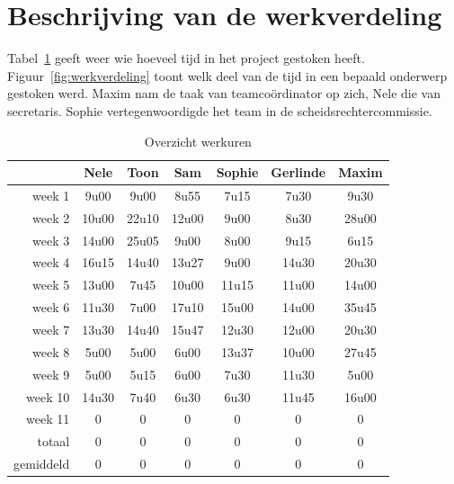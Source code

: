 \documentclass[eind]{penoverslag}
\begin{document}
\section{Beschrijving van de werkverdeling}
\label{Assec:werkverdeling}
Tabel~\ref{tab:werkuren} geeft weer wie hoeveel tijd in het project gestoken heeft. Figuur~\ref{fig:werkverdeling} toont welk deel van de tijd in een bepaald onderwerp gestoken werd.
Maxim nam de taak van teamco\"ordinator op zich, Nele die van secretaris. Sophie vertegenwoordigde het team in de scheidsrechtercommissie.

\begin{table}[h]
\begin{center}
    \begin{tabular}{ r | c  c  c  c  c  c}
     & Nele & Toon & Sam & Sophie & Gerlinde & Maxim \\ \hline
    week 1 & 9u00 & 9u00 & 8u55 & 7u15 & 7u30 & 9u30\\
   	week 2 & 10u00 & 22u10 & 12u00 & 9u00 & 8u30 & 28u00\\
	week 3 & 14u00 & 25u05 & 9u00 & 8u00 & 9u15 & 6u15\\
	week 4 & 16u15 & 14u40 & 13u27 & 9u00 & 14u30 & 20u30\\
	week 5 & 13u00 & 7u45 & 10u00 & 11u15 & 11u00 & 14u00\\
	week 6 & 11u30 & 7u00 & 17u10 & 15u00 & 14u00 & 35u45\\
	week 7 & 13u30 & 14u40 & 15u47 & 12u30 & 12u00 & 20u30\\
	week 8 & 5u00 & 5u00 & 6u00 & 13u37 & 10u00 & 27u45\\
	week 9 & 5u00 & 5u15 & 6u00 & 7u30 & 11u30 & 5u00\\
	week 10 & 14u30 & 7u40 & 6u30 & 6u30 & 11u45 & 16u00\\
	week 11 & 0 & 0 & 0 & 0 & 0 & 0\\ \hline
	totaal & 0 & 0 & 0 & 0 & 0 & 0 \\
	gemiddeld & 0 & 0 & 0 & 0 & 0 & 0
    \end{tabular}
    \caption{Overzicht werkuren}
    \label{tab:werkuren}
\end{center}
\end{table}
\end{document}
